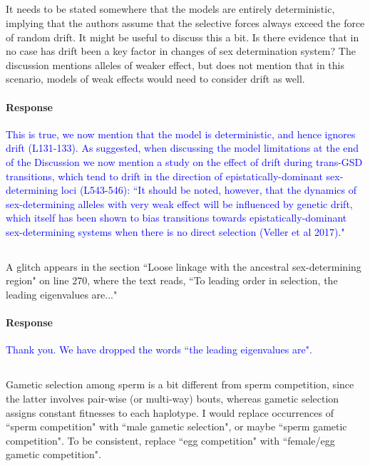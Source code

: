 \documentclass[10pt,letterpaper]{article}
\begin{document}
\noindent\subsection{}
It needs to be stated somewhere that the models are entirely deterministic, implying that the authors assume that the selective forces always exceed the force of random drift. It might be useful to discuss this a bit. Is there evidence that in no case has drift been a key factor in changes of sex determination system?  The discussion mentions alleles of weaker effect, but does not mention that in this scenario, models of weak effects would need to consider drift as well.

\noindent\paragraph{Response}
\textcolor{blue}{
This is true, we now mention that the model is deterministic, and hence ignores drift (L131-133). 
As suggested, when discussing the model limitations at the end of the Discussion we now mention a study on the effect of drift during trans-GSD transitions, which tend to drift in the direction of epistatically-dominant sex-determining loci (L543-546): ``It should be noted, however, that the dynamics of sex-determining alleles with very weak effect will be influenced by genetic drift, which itself has been shown to bias transitions towards epistatically-dominant sex-determining systems when there is no direct selection (Veller et al 2017)."}

\noindent\subsection{}
A glitch appears in the section ``Loose linkage with the ancestral sex-determining region" on line 270, where the text reads, ``To leading order in selection, the leading eigenvalues are..."

\noindent\paragraph{Response}
\textcolor{blue}{Thank you. We have dropped the words ``the leading eigenvalues are".}

\noindent\subsection{}
Gametic selection among sperm is a bit different from sperm competition, since the latter involves pair-wise (or multi-way) bouts, whereas gametic selection assigns constant fitnesses to each haplotype. I would replace occurrences of ``sperm competition" with ``male gametic selection", or maybe ``sperm gametic competition". To be consistent, replace ``egg competition" with ``female/egg gametic competition". 
\end{document}
